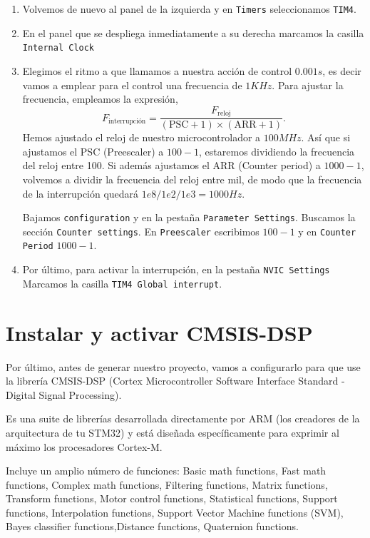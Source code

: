 \begin{enumerate}
	\item Volvemos de nuevo al panel de la izquierda y en  \texttt{Timers} seleccionamos \texttt{TIM4}. 
	\item En el panel que se despliega inmediatamente a su derecha marcamos la casilla \texttt{Internal Clock}
	\item Elegimos el ritmo a que llamamos a nuestra acción de control $0.001s$, es decir vamos a emplear para el control una frecuencia de $1KHz$. Para ajustar la frecuencia, empleamos la expresión,
	\begin{equation*}
		F_{\text{interrupción}} = \frac{F_{\text{reloj}}}{(\text{PSC}+1) \times (\text{ARR}+1)}.
	\end{equation*}
Hemos ajustado el reloj de nuestro microcontrolador a $100MHz$. Así que si ajustamos el PSC (Preescaler) a $100 -1 $, estaremos dividiendo la frecuencia del reloj entre 100. Si además ajustamos el ARR (Counter period) a $1000 - 1$, volvemos a dividir la frecuencia del reloj entre mil, de modo que la frecuencia de la interrupción quedará $1e8/1e2/1e3 = 1000 Hz$. 

Bajamos \texttt{configuration} y en la pestaña \texttt{Parameter Settings}. Buscamos la sección \texttt{Counter settings}. En \texttt{Preescaler} escribimos $100-1$ y en \texttt{Counter Period} $1000 -1$.

\item Por último, para activar la interrupción, en la pestaña \texttt{NVIC Settings} Marcamos la casilla \texttt{TIM4 Global interrupt}.
\end{enumerate}

\section{Instalar y activar CMSIS-DSP}
Por último, antes de generar nuestro proyecto, vamos a configurarlo para que use la librería CMSIS-DSP (Cortex Microcontroller Software Interface Standard - Digital Signal Processing).

Es una suite de librerías desarrollada directamente por ARM (los creadores de la arquitectura de tu STM32) y está diseñada específicamente para exprimir al máximo los procesadores Cortex-M.

 Incluye un amplio número de funciones: Basic math functions, Fast math functions, Complex math functions, Filtering functions, Matrix functions, Transform functions, Motor control functions, Statistical functions, Support functions, Interpolation functions, Support Vector Machine functions (SVM), Bayes classifier functions,Distance functions, Quaternion functions. 

